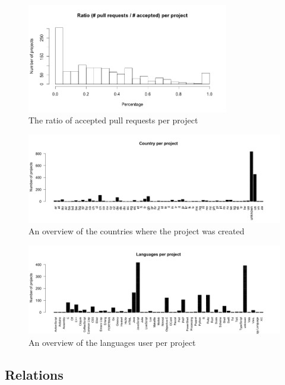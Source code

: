 	    \begin{figure}[h]
	        \includegraphics[width=250pt]{figures/ratio-pull-request-per-project}
	        \caption{The ratio of accepted pull requests per project}
	        \label{fig:ratio-pull-requests-plot}
	    \end{figure}

	    \begin{figure}[t!]
	        \includegraphics[width=500pt]{figures/country-per-project}
	        \caption{An overview of the countries where the project was created}
	        \label{fig:country-plot}
	    \end{figure}

	    \begin{figure}[t!]
	        \includegraphics[width=500pt]{figures/languages-per-project}
	        \caption{An overview of the languages user per project}
	        \label{fig:language-frequency-plot}
	    \end{figure}
    
    \subsection{Relations}
    
